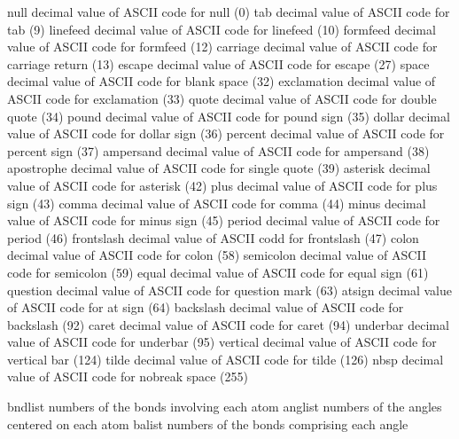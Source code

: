 \documentclass[letterpaper,11pt,english]{sphinxmanual}
\begin{document}
\begin{sphinxVerbatim}[commandchars=\\\{\}]
null            decimal value of ASCII code for null (0)
tab             decimal value of ASCII code for tab (9)
linefeed        decimal value of ASCII code for linefeed (10)
formfeed        decimal value of ASCII code for formfeed (12)
carriage        decimal value of ASCII code for carriage return (13)
escape          decimal value of ASCII code for escape (27)
space           decimal value of ASCII code for blank space (32)
exclamation     decimal value of ASCII code for exclamation (33)
quote           decimal value of ASCII code for double quote (34)
pound           decimal value of ASCII code for pound sign (35)
dollar          decimal value of ASCII code for dollar sign (36)
percent         decimal value of ASCII code for percent sign (37)
ampersand       decimal value of ASCII code for ampersand (38)
apostrophe      decimal value of ASCII code for single quote (39)
asterisk        decimal value of ASCII code for asterisk (42)
plus            decimal value of ASCII code for plus sign (43)
comma           decimal value of ASCII code for comma (44)
minus           decimal value of ASCII code for minus sign (45)
period          decimal value of ASCII code for period (46)
frontslash      decimal value of ASCII codd for frontslash (47)
colon           decimal value of ASCII code for colon (58)
semicolon       decimal value of ASCII code for semicolon (59)
equal           decimal value of ASCII code for equal sign (61)
question        decimal value of ASCII code for question mark (63)
atsign          decimal value of ASCII code for at sign (64)
backslash       decimal value of ASCII code for backslash (92)
caret           decimal value of ASCII code for caret (94)
underbar        decimal value of ASCII code for underbar (95)
vertical        decimal value of ASCII code for vertical bar (124)
tilde           decimal value of ASCII code for tilde (126)
nbsp            decimal value of ASCII code for nobreak space (255)
\end{sphinxVerbatim}


\begin{sphinxVerbatim}[commandchars=\\\{\}]
bndlist         numbers of the bonds involving each atom
anglist         numbers of the angles centered on each atom
balist          numbers of the bonds comprising each angle
\end{sphinxVerbatim}
\end{document}
